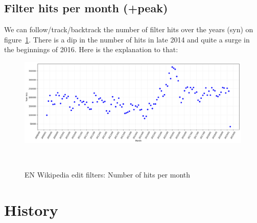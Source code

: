 \subsection{Filter hits per month (+peak)}
We can follow/track/backtrack the number of filter hits over the years (syn) on figure~\ref{fig:filter-hits}.
There is a dip in the number of hits in late 2014 and quite a surge in the beginnings of 2016.
Here is the explanation to that:

\begin{figure}
\centering
  \includegraphics[width=0.9\columnwidth]{pics/filter-hits-zoomed.png}
  \caption{EN Wikipedia edit filters: Number of hits per month}~\label{fig:filter-hits}
\end{figure}


\section{History}

